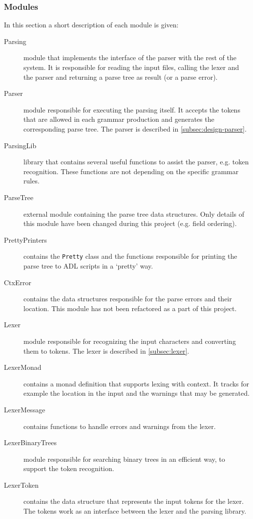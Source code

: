   \subsubsection{Modules}
  \label{subsec:parser-modules}
  In this section a short description of each module is given:
  \begin{description}
    \item[Parsing] module that implements the interface of the parser with the rest of the system.
      It is responsible for reading the input files, calling the lexer and the parser and returning a parse tree as result (or a parse error).

    \item[Parser] module responsible for executing the parsing itself.
      It accepts the tokens that are allowed in each grammar production and generates the corresponding parse tree.
      The parser is described in \autoref{subsec:design-parser}.
      
    \item[ParsingLib] library that contains several useful functions to assist the parser, e.g. token recognition.
      These functions are not depending on the specific grammar rules.
      
    \item[ParseTree] external module containing the parse tree data structures.
      Only details of this module have been changed during this project (e.g. field ordering).
    
    \item[PrettyPrinters] contains the \texttt{Pretty} class and the functions responsible for printing the parse tree to ADL scripts in a `pretty' way.
    
    \item[CtxError] contains the data structures responsible for the parse errors and their location.
      This module has not been refactored as a part of this project.
    
    \item[Lexer] module responsible for recognizing the input characters and converting them to tokens.
      The lexer is described in \autoref{subsec:lexer}.
    
    \item[LexerMonad] contains a monad definition that supports lexing with context.
      It tracks for example the location in the input and the warnings that may be generated.
    
    \item[LexerMessage] contains functions to handle errors and warnings from the lexer.
    
    \item[LexerBinaryTrees] module responsible for searching binary trees in an efficient way, to support the token recognition.
    
    \item[LexerToken] contains the data structure that represents the input tokens for the lexer.
      The tokens work as an interface between the lexer and the parsing library.
  \end{description}

